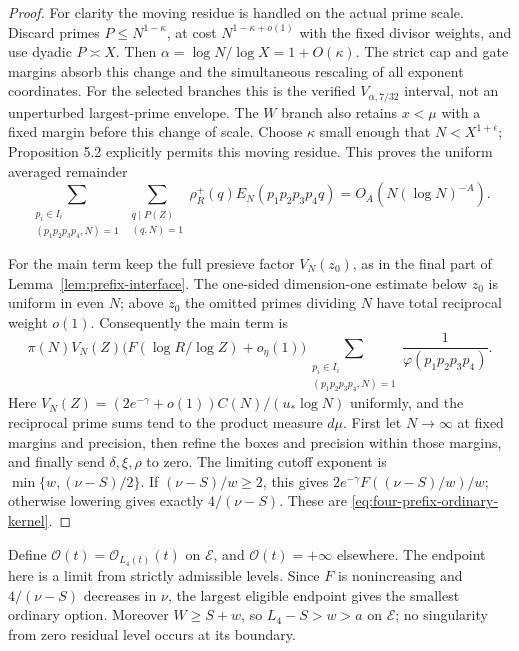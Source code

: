 \documentclass[11pt]{article}
\begin{document}
\begin{proof}
For clarity the moving residue is handled on the actual prime
scale.  Discard primes $P\le N^{1-\kappa}$, at cost
$N^{1-\kappa+o(1)}$ with the fixed divisor weights, and use dyadic
$P\asymp X$.  Then $\alpha=\log N/\log X=1+O(\kappa)$.
The strict cap and gate margins absorb this change and the
simultaneous rescaling of all exponent coordinates.  For the
selected branches this is the verified
$V_{\alpha,7/32}$ interval, not an unperturbed largest-prime
envelope.  The $W$ branch also retains $x<\mu$ with a fixed
margin before this change of scale.  Choose $\kappa$ small enough
that $N<X^{1+\epsilon}$; Proposition 5.2 explicitly permits this
moving residue.  This proves the uniform averaged remainder
\[
 \sum_{\substack{p_i\in I_i\\(p_1p_2p_3p_4,N)=1}}
 \sum_{\substack{q\mid P(Z)\\(q,N)=1}}
 \rho_R^+(q)E_N(p_1p_2p_3p_4q)
 =O_A(N(\log N)^{-A}).
\]

For the main term keep the full presieve factor $V_N(z_0)$, as in
the final part of Lemma~\ref{lem:prefix-interface}.  The one-sided
dimension-one estimate below $z_0$ is uniform in even $N$; above
$z_0$ the omitted primes dividing $N$ have total reciprocal weight
$o(1)$.  Consequently the main term is
\[
 \pi(N)V_N(Z)\bigl(F(\log R/\log Z)+o_\eta(1)\bigr)
 \sum_{\substack{p_i\in I_i\\(p_1p_2p_3p_4,N)=1}}
       \frac1{\varphi(p_1p_2p_3p_4)}.
\]
Here $V_N(Z)=(2e^{-\gamma}+o(1))C(N)/(u_*\log N)$ uniformly,
and the reciprocal prime sums tend to the product measure $d\mu$.
First let $N\to\infty$ at fixed margins and precision, then refine
the boxes and precision within those margins, and finally send
$\delta,\xi,\rho$ to zero.  The limiting cutoff exponent is
$\min\{w,(\nu-S)/2\}$.  If $(\nu-S)/w\ge2$, this gives
$2e^{-\gamma}F((\nu-S)/w)/w$; otherwise lowering gives exactly
$4/(\nu-S)$.  These are \eqref{eq:four-prefix-ordinary-kernel}.
\end{proof}

Define $\mathcal O(t)=\mathcal O_{L_4(t)}(t)$ on $\mathcal E$,
and $\mathcal O(t)=+\infty$ elsewhere.  The endpoint here is a limit
from strictly admissible levels.  Since $F$ is nonincreasing and
$4/(\nu-S)$ decreases in $\nu$, the largest eligible endpoint
gives the smallest ordinary option.  Moreover $W\ge S+w$, so
$L_4-S>w>a$ on $\mathcal E$; no singularity from zero residual
level occurs at its boundary.
\end{document}

